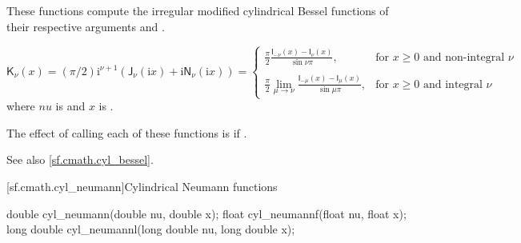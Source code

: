 \begin{itemdescr}

\pnum\effects
These functions compute
the irregular modified cylindrical Bessel functions
of their respective arguments
 and .

\pnum\returns
\[%
  \mathsf{K}_\nu(x) =
  (\pi/2)\mathrm{i}^{\nu+1} (            \mathsf{J}_\nu(\mathrm{i}x)
			    + \mathrm{i} \mathsf{N}_\nu(\mathrm{i}x)
			    )
  =
  \left\{
  \begin{array}{cl}
  \displaystyle
  \frac{\pi}{2}
  \frac{\mathsf{I}_{-\nu}(x) - \mathsf{I}_{\nu}(x)}
       {\sin \nu\pi },
  & \mbox{for $x \ge 0$ and non-integral $\nu$}
  \\
  \\
  \displaystyle
  \frac{\pi}{2}
  \lim_{\mu \rightarrow \nu} \frac{\mathsf{I}_{-\mu}(x) - \mathsf{I}_{\mu}(x)}
                                  {\sin \mu\pi },
  & \mbox{for $x \ge 0$ and integral $\nu$}
  \end{array}
  \right.
\]
where
$nu$ is  and
$x$ is .

\pnum\remark
The effect of calling each of these functions
is 
if .

\pnum See also \ref{sf.cmath.cyl_bessel}.
\end{itemdescr}

[sf.cmath.cyl_neumann]{Cylindrical Neumann functions}%
%
%
%
%
%
%
\begin{itemdecl}
double       cyl_neumann(double nu, double x);
float        cyl_neumannf(float nu, float x);
long double  cyl_neumannl(long double nu, long double x);
\end{itemdecl}

